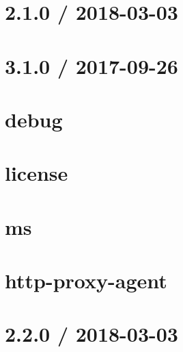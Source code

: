 \let\mypdfximage\pdfximage\def\pdfximage{\immediate\mypdfximage}\documentclass[twoside]{book}
\newcommand{\+}{\discretionary{\mbox{\scriptsize$\hookleftarrow$}}{}{}}
\begin{document}
\chapter{2.1.0 / 2018-\/03-\/03}
\label{md_heap-visualizer_node_modules_http-proxy-agent__history}

\chapter{3.1.0 / 2017-\/09-\/26}
\label{md_heap-visualizer_node_modules_http-proxy-agent_node_modules_debug__c_h_a_n_g_e_l_o_g}

\chapter{debug}
\label{md_heap-visualizer_node_modules_http-proxy-agent_node_modules_debug__r_e_a_d_m_e}

\chapter{license}
\label{md_heap-visualizer_node_modules_http-proxy-agent_node_modules_ms_license}

\chapter{ms}
\label{md_heap-visualizer_node_modules_http-proxy-agent_node_modules_ms_readme}

\chapter{http-\/proxy-\/agent}
\label{md_heap-visualizer_node_modules_http-proxy-agent__r_e_a_d_m_e}

\chapter{2.2.0 / 2018-\/03-\/03}
\label{md_heap-visualizer_node_modules_https-proxy-agent__history}

\end{document}
